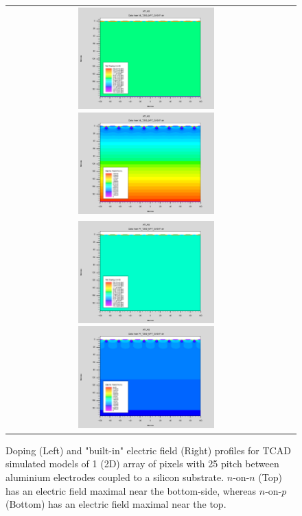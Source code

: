 \begin{figure}[h]
  \begin{center}
    \begin{tabular}{cc}
      \includegraphics[width=0.5\textwidth]{fig_FastTiming/Net_Doping_nonn.png}
      \includegraphics[width=0.5\textwidth]{fig_FastTiming/ElectricField_nonn.png} \\
      \includegraphics[width=0.5\textwidth]{fig_FastTiming/Net_Doping_nonp.png}
      \includegraphics[width=0.5\textwidth]{fig_FastTiming/ElectricField_nonp.png} \\
    \end{tabular}
    \caption{Doping (Left) and "built-in" electric field (Right) profiles for TCAD simulated models of 1  (2D) array of pixels with 25 \si{\micron} pitch between aluminium electrodes coupled to a silicon substrate.
            $n$-on-$n$ (Top) has an electric field maximal near the bottom-side, whereas $n$-on-$p$ (Bottom) has an electric field maximal near the top.
            }
    \label{Doping_ElectricField}
  \end{center}
\end{figure}

